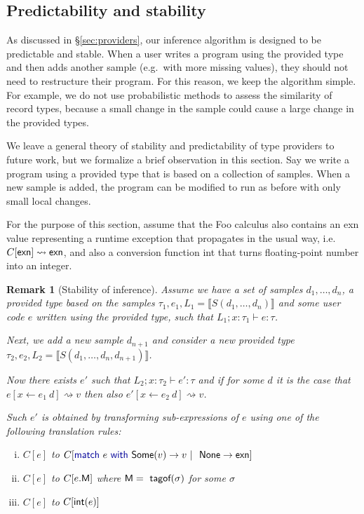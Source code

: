 \documentclass[10pt]{sigplanconf}
\newcommand{\kvd}[1]{\textnormal{\textcolor{kvdclr}{\sffamily #1}}}
\newcommand{\ident}[1]{\textnormal{\sffamily #1}}
\newcommand{\tytagof}{\ident{tagof}}
\newcommand{\reduce}{\rightsquigarrow}
\newcommand{\sem}[1]{\llbracket #1 \rrbracket}
\newcommand{\semalt}[1]{S(#1)}
\newtheorem{remark}{Remark}
\begin{document}

\subsection{Predictability and stability}
\label{sec:impl-stable}

As discussed in \S\ref{sec:providers}, our inference algorithm is designed to be predictable
and stable. When a user writes a program using the provided type and then adds another sample
(e.g.~with more missing values), they should not need to restructure their program.
For this reason, we keep the algorithm simple. For example, we do not use probabilistic methods to
assess the similarity of record types, because a small change in the sample could cause a large change
in the provided types.

We leave a general theory of stability and predictability of type providers to future work, but
we formalize a brief observation in this section. Say we write a program using a provided type
that is based on a collection of samples. When a new sample is added, the program can be modified
to run as before with only small local changes.

For the purpose of this section, assume that the Foo calculus also contains an \ident{exn}
value representing a runtime exception that propagates in the usual way,
i.e.~$C[\ident{exn}]\reduce\ident{exn}$, and also a conversion function \ident{int} that
turns floating-point number into an integer.

\begin{remark}[Stability of inference]
Assume we have a set of samples $d_1, \ldots, d_n$, a provided type based on the samples
$\tau_1, e_1, L_1 = \sem{\semalt{d_1, \ldots, d_n}}$ and some user code $e$ written using
the provided type, such that $L_1; x:\tau_1\vdash e : \tau$.

Next, we add a new sample $d_{n+1}$ and consider a new provided type
$\tau_2, e_2, L_2 = \sem{\semalt{d_1, \ldots, d_n, d_{n+1}}}$.

Now there exists $e'$ such that $L_2; x:\tau_2\vdash e' : \tau$ and if
for some $d$ it is the case that $e[x\leftarrow e_1~d] \reduce v$ then
also $e'[x\leftarrow e_2~d] \reduce v$.

Such $e'$ is obtained by transforming sub-expressions of $e$ using one of the following
translation rules:
%
\begin{enumerate}[(i)]
\item
$C[e]$ to $C[\kvd{match}~e~\kvd{with}~\ident{Some}(v) \rightarrow v~|~\ident{None} \rightarrow \ident{exn}]$
\item
$C[e]$ to $C[e.\ident{M}]$ where $\ident{M} = \tytagof(\sigma)$ for some $\sigma$
\item
$C[e]$ to $C[\ident{int}(e)]$
\end{enumerate}
\end{remark}
\end{document}
